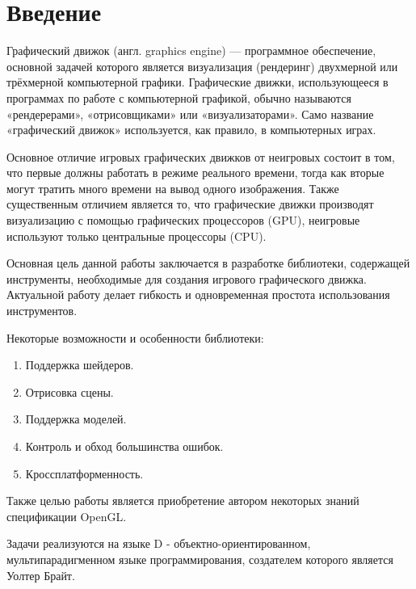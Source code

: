 \chapter*{Введение}
Графический движок (англ. graphics engine) — программное обеспечение,
основной задачей которого является визуализация (рендеринг) двухмерной или трёхмерной
компьютерной графики. Графические движки, использующееся в программах по работе с компьютерной графикой,
обычно называются «рендерерами», «отрисовщиками» или «визуализаторами».
Само название «графический движок» используется, как правило, в компьютерных играх.

Основное отличие игровых графических движков от неигровых состоит в том, что первые должны работать в режиме реального времени,
тогда как вторые могут тратить много времени
на вывод одного изображения. Также существенным отличием является то, что графические движки производят визуализацию с помощью
графических процессоров (GPU), неигровые используют только центральные процессоры (CPU).

Основная цель данной работы заключается в разработке библиотеки, содержащей инструменты, необходимые для
создания игрового графического движка. Актуальной работу делает гибкость и одновременная простота использования инструментов.

Некоторые возможности и особенности библиотеки:
\begin{enumerate}
\item Поддержка шейдеров.
\item Отрисовка сцены.
\item Поддержка моделей.
\item Контроль и обход большинства ошибок.
\item Кроссплатформенность.
\end{enumerate}
Также целью работы является приобретение автором некоторых знаний спецификации OpenGL.

Задачи реализуются на языке D - объектно-ориентированном, мультипарадигменном языке программирования, 
создателем которого является Уолтер Брайт. 